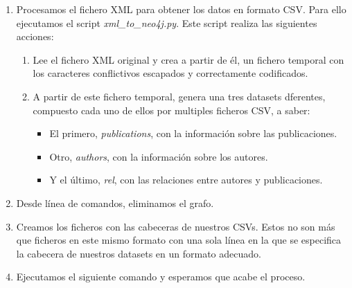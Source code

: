 \begin{enumerate}
 \item Procesamos el fichero \gls{XML} para obtener los datos en formato \gls{CSV}. Para ello ejecutamos el script \textit{xml\_to\_neo4j.py}. Este script realiza las siguientes acciones:
 \begin{enumerate}
  \item Lee el fichero \gls{XML} original y crea a partir de él, un fichero temporal con los caracteres conflictivos escapados y correctamente codificados.
  \item A partir de este fichero temporal, genera una tres \gls{datasets} dferentes, compuesto cada uno de ellos por multiples ficheros \gls{CSV}, a saber:
  \begin{itemize}
   \item El primero, \textit{publications}, con la información sobre las publicaciones.
   \item Otro, \textit{authors}, con la información sobre los autores.
   \item Y el último, \textit{rel}, con las relaciones entre autores y publicaciones.
  \end{itemize}
 \end{enumerate}
 \item Desde línea de comandos, eliminamos el grafo.
 \item Creamos los ficheros con las cabeceras de nuestros \gls{CSVs}. Estos no son más que ficheros en este mismo formato con una sola línea en la que se especifica la cabecera de nuestros datasets en un formato adecuado.
 \item Ejecutamos el siguiente comando y esperamos que acabe el proceso.
\end{enumerate}




